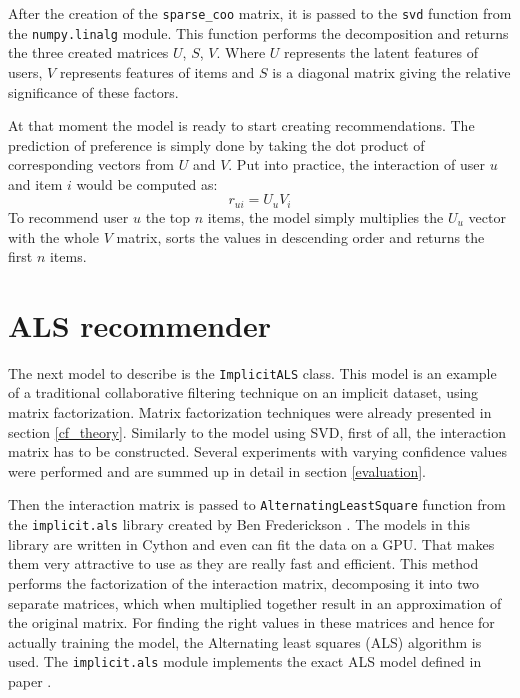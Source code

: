 After the creation of the \texttt{sparse\_coo} matrix, it is passed to the \texttt{svd} function from the \texttt{numpy.linalg} module. This function performs the decomposition and returns the three created matrices $U$, $S$, $V$. Where $U$ represents the latent features of users, $V$ represents features of items and $S$ is a diagonal matrix giving the relative significance of these factors. 

At that moment the model is ready to start creating recommendations. The prediction of preference is simply done by taking the dot product of corresponding vectors from $U$ and $V$. Put into practice, the interaction of user $u$ and item $i$ would be computed as:
\begin{equation}
    r_{ui} = U_u V_i
\end{equation}
To recommend user $u$ the top $n$ items, the model simply multiplies the $U_u$ vector with the whole $V$ matrix, sorts the values in descending order and returns the first $n$ items.

\section{ALS recommender} \label{als_implementation}
The next model to describe is the \texttt{ImplicitALS} class. This model is an example of a traditional collaborative filtering technique on an implicit dataset, using matrix factorization. Matrix factorization techniques were already presented in section \ref{cf_theory}. Similarly to the model using SVD, first of all, the interaction matrix has to be constructed. Several experiments with varying confidence values were performed and are summed up in detail in section \ref{evaluation}. 

Then the interaction matrix is passed to \texttt{AlternatingLeastSquare} function from the \texttt{implicit.als} library created by Ben Frederickson \cite{BenImplicit}. The models in this library are written in Cython and even can fit the data on a GPU. That makes them very attractive to use as they are really fast and efficient. This method performs the factorization of the interaction matrix, decomposing it into two separate matrices, which when multiplied together result in an approximation of the original matrix. For finding the right values in these matrices and hence for actually training the model, the Alternating least squares (ALS) algorithm is used. The \texttt{implicit.als} module implements the exact ALS model defined in paper \cite{Implicit}. 

